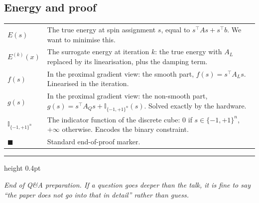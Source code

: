 \documentclass[11pt,a4paper]{article}
\begin{document}
\subsection*{\small\color{accent} Energy and proof}
\begin{tabular}{@{}p{2.4cm}p{14cm}@{}}
$E(s)$         & The true energy at spin assignment $s$, equal to $s^{\top} A s + s^{\top} b$. We want to minimise this. \\
$E^{(k)}(x)$   & The surrogate energy at iteration $k$: the true energy with $A_L$ replaced by its linearisation, plus the damping term. \\
$f(s)$         & In the proximal gradient view: the smooth part, $f(s) = s^{\top} A_L s$. Linearised in the iteration. \\
$g(s)$         & In the proximal gradient view: the non-smooth part, $g(s) = s^{\top} A_Q s + \mathbb{I}_{\{-1,+1\}^n}(s)$. Solved exactly by the hardware. \\
$\mathbb{I}_{\{-1,+1\}^n}$ & The indicator function of the discrete cube: $0$ if $s \in \{-1,+1\}^n$, $+\infty$ otherwise. Encodes the binary constraint. \\
$\blacksquare$ & Standard end-of-proof marker. \\
\end{tabular}

\vspace{2em}
\hrule height 0.4pt
\vspace{0.4em}
\begin{center}
\small\itshape\color{muted}
End of Q\&A preparation. If a question goes deeper than the talk, it is fine to say
``the paper does not go into that in detail'' rather than guess.
\end{center}
\end{document}
